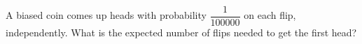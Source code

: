 A biased coin comes up heads with probability $\dfrac{1}{100000}$ on each flip, independently. What is the expected number of flips needed to get the first head?
